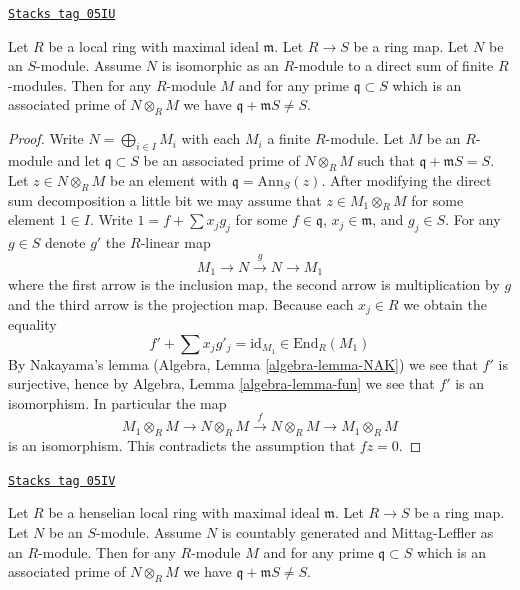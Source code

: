 \begin{lemma}
\label{flat-lemma-explain-why-pure-direct-sum-finite-modules}
\href{https://stacks.math.columbia.edu/tag/05IU}{\texttt{Stacks tag 05IU}}

Let $R$ be a local ring with maximal ideal $\mathfrak m$.
Let $R \to S$ be a ring map. Let $N$ be an $S$-module.
Assume $N$ is isomorphic as an $R$-module to a direct
sum of finite $R$-modules. Then for any $R$-module $M$ and
for any prime $\mathfrak q \subset S$ which is an associated prime of
$N \otimes_R M$ we have $\mathfrak q + \mathfrak m S \not = S$.
\end{lemma}

\begin{proof}
Write $N = \bigoplus_{i \in I} M_i$ with each $M_i$ a finite $R$-module.
Let $M$ be an $R$-module and let $\mathfrak q \subset S$ be an associated
prime of $N \otimes_R M$ such that $\mathfrak q + \mathfrak m S = S$. Let
$z \in N \otimes_R M$ be an element with $\mathfrak q = \text{Ann}_S(z)$.
After modifying the direct sum decomposition a little bit we may assume that
$z \in M_1 \otimes_R M$ for some element $1 \in I$. Write
$1 = f + \sum x_j g_j$ for some $f \in \mathfrak q$, $x_j \in \mathfrak m$,
and $g_j \in S$. For any $g \in S$ denote $g'$ the $R$-linear map
$$
M_1 \to N \xrightarrow{g} N \to M_1
$$
where the first arrow is the inclusion map, the second arrow is multiplication
by $g$ and the third arrow is the projection map. Because each $x_j \in R$
we obtain the equality
$$
f' + \sum x_j g'_j = \text{id}_{M_1} \in \text{End}_R(M_1)
$$
By Nakayama's lemma
(Algebra, Lemma \ref{algebra-lemma-NAK})
we see that $f'$ is surjective, hence by
Algebra, Lemma \ref{algebra-lemma-fun}
we see that $f'$ is an isomorphism. In particular the map
$$
M_1 \otimes_R M \to N \otimes_R M \xrightarrow{f} N \otimes_R M
\to M_1 \otimes_R M
$$
is an isomorphism. This contradicts the assumption that $fz = 0$.
\end{proof}

\begin{lemma}
\label{flat-lemma-explain-why-pure-ML}
\href{https://stacks.math.columbia.edu/tag/05IV}{\texttt{Stacks tag 05IV}}

Let $R$ be a henselian local ring with maximal ideal $\mathfrak m$.
Let $R \to S$ be a ring map. Let $N$ be an $S$-module.
Assume $N$ is countably generated and Mittag-Leffler as an $R$-module.
Then for any $R$-module $M$ and for any prime $\mathfrak q \subset S$
which is an associated prime of $N \otimes_R M$ we have
$\mathfrak q + \mathfrak m S \not = S$.
\end{lemma}

